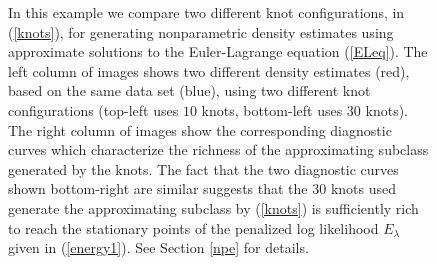 \documentclass[noinfoline]{imsart}
\begin{document}
\begin{figure}[t]
\caption{In this example we compare two different knot configurations, in (\ref{knots}), for generating nonparametric density estimates using approximate solutions to the  Euler-Lagrange equation (\ref{ELeq}). The left column of images shows two different density estimates (red), based on the same data set (blue), using two different knot configurations (top-left uses $10$ knots, bottom-left uses $30$ knots). The right column of images show the corresponding  diagnostic curves which characterize the richness of the approximating subclass generated by the knots. The fact that the two diagnostic curves shown bottom-right are similar suggests that the $30$ knots used generate the approximating subclass by (\ref{knots}) is sufficiently rich to reach the stationary points of the penalized log likelihood $E_\lambda$ given in (\ref{energy1}).
See Section \ref{npe} for details.
 \label{f2}
 }
\end{figure}
\end{document}
